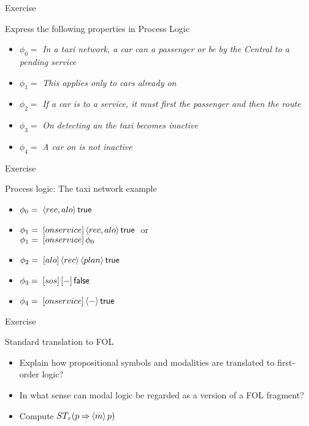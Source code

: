 \documentclass{beamer}
\begin{document}
\begin{slide}{Exercise}\label{s:26}
\small
\begin{exampleblock}{Express the following properties in Process Logic}
\begin{itemize}
\item $\phi_0 =$ \emph{In a taxi network, a car can  a passenger or be  by the Central to a pending service}
\item $\phi_1 =$ \emph{This applies only to cars already on }
\item $\phi_2 =$
 \emph{If a car is  to a service, it must first  the passenger and then  the route}
\item $\phi_3 =$ \emph{On detecting an  the taxi becomes inactive}
\item $\phi_4 =$ \emph{A car on  is not inactive}
\end{itemize}
\end{exampleblock}
\end{slide}

\begin{slide}{Exercise}\label{s:27}
\small
\begin{exampleblock}{Process logic: The taxi network example}
\begin{itemize}
\item $\phi_0 =\; \langle rec,alo \rangle\, \mathsf{true}$ 
\item $\phi_1 =\;  [onservice]\, \langle rec,alo \rangle\, \mathsf{true}\; $ or\\
$\phi_1 =\;   [onservice]\, \phi_0$
\item $\phi_2 =\;  [alo]\, \langle rec \rangle\, \langle plan \rangle\, \mathsf{true}$
\item $\phi_3 =\;  [sos]\, [-]\, \mathsf{false}$
\item $\phi_4 =\;  [onservice]\, \langle - \rangle\, \mathsf{true}$
\end{itemize}
\end{exampleblock}
\end{slide}


\begin{slide}{Exercise}\label{s:28}
\small
\begin{exampleblock}{Standard translation to FOL}
\begin{itemize}
\item Explain how propositional symbols and modalities are translated to first-order logic?
\item In what sense can modal logic be regarded as a  version of a FOL fragment?
\item Compute  $ST_x (p \mathbin{\Rightarrow} \langle m \rangle\, p)$ 
\end{itemize}
\end{exampleblock}
\end{slide}
\end{document}
